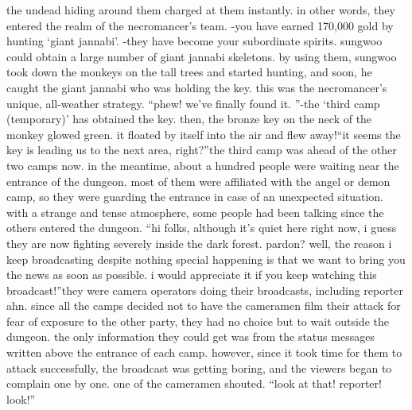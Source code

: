 the undead hiding around them charged at them instantly.
in other words, they entered the realm of the necromancer’s team.
-you have earned 170,000 gold by hunting ‘giant jannabi’.
-they have become your subordinate spirits.
sungwoo could obtain a large number of giant jannabi skeletons.
by using them, sungwoo took down the monkeys on the tall trees and started hunting, and soon, he caught the giant jannabi who was holding the key.
this was the necromancer’s unique, all-weather strategy.
“phew! we’ve finally found it.
”-the ‘third camp (temporary)’ has obtained the key.
then, the bronze key on the neck of the monkey glowed green.
 it floated by itself into the air and flew away!“it seems the key is leading us to the next area, right?”the third camp was ahead of the other two camps now.
in the meantime, about a hundred people were waiting near the entrance of the dungeon.
most of them were affiliated with the angel or demon camp, so they were guarding the entrance in case of an unexpected situation.
with a strange and tense atmosphere, some people had been talking since the others entered the dungeon.
“hi folks, although it’s quiet here right now, i guess they are now fighting severely inside the dark forest.
 pardon? well, the reason i keep broadcasting despite nothing special happening is that we want to bring you the news as soon as possible.
 i would appreciate it if you keep watching this broadcast!”they were camera operators doing their broadcasts, including reporter ahn.
since all the camps decided not to have the cameramen film their attack for fear of exposure to the other party, they had no choice but to wait outside the dungeon.
the only information they could get was from the status messages written above the entrance of each camp.
 however, since it took time for them to attack successfully, the broadcast was getting boring, and the viewers began to complain one by one.
one of the cameramen shouted.
“look at that! reporter! look!”

 